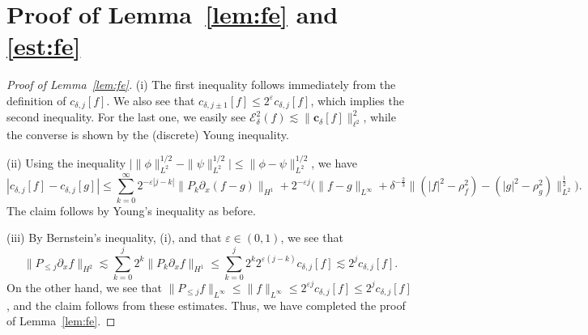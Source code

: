 \documentclass{amsart}
\numberwithin{equation}{section}
\newcommand{\eps}{\varepsilon}
\begin{document}

 \section{Proof of Lemma~\ref{lem:fe} and \eqref{est:fe}}
\label{sec:app-fe}

\begin{proof}[Proof of Lemma~\ref{lem:fe}]
(i) The first inequality follows immediately from the definition of $c_{\delta,j}[f]$. 
We also see that $c_{\delta,j\pm 1}[f]\leq 2^{\eps}c_{\delta,j}[f]$, which implies the second inequality.
For the last one, we easily see $\mathcal{E}^2_\delta(f)\lesssim \| \mathbf{c}_\delta[f]\|_{\ell^2}^2$, while the converse is shown by the (discrete) Young inequality.

(ii) Using the inequality $\big| \| \phi \|_{L^2}^{1/2} -\| \psi \|_{L^2}^{1/2}\big|\leq \| \phi -\psi \|_{L^2}^{1/2}$, we have 
\[ |c_{\delta,j}[f] - c_{\delta,j}[g]| \leq \sum_{k=0}^{\infty} 2^{-\eps |j-k|}
\big\| P_{k}\partial_x(f-g)\big\|_{H^1}+2^{-\eps j}\Big( \| f-g\|_{L^\infty} +\delta^{-\frac23}\big\| (|f|^2-\rho_f^2)-(|g|^2-\rho_g^2)\big\|_{L^2}^{\frac12}\Big) .\]
The claim follows by Young's inequality as before. 

(iii) By Bernstein's inequality, (i), and that $\eps \in (0,1)$, we see that 
\[ \| P_{\leq j} \partial_x f \|_{H^2} 
\lesssim \sum_{k=0}^{j} 2^{k} 
\| P_{k} \partial_{x} f \|_{H^1} \leq \sum_{k=0}^{j} 2^{k} 2^{\eps (j-k)} 
c_{\delta,j}[f] \lesssim 2^{j} c_{\delta,j}[f]. \]
On the other hand, we see that $\| P_{\leq j}f\|_{L^\infty}\leq \| f\|_{L^\infty}\leq 2^{\eps j}c_{\delta,j}[f]\leq 2^jc_{\delta,j}[f]$, and the claim follows from these estimates. 
Thus, we have completed the proof of Lemma~\ref{lem:fe}.
\end{proof}
\end{document}
